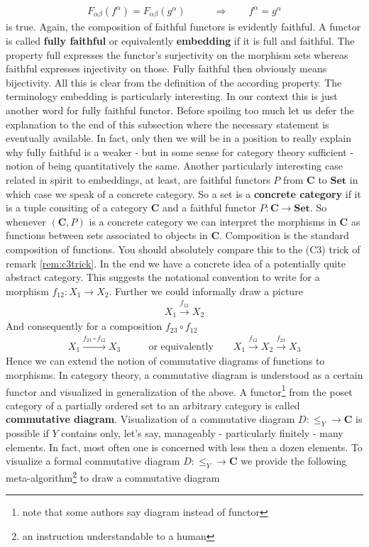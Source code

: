 \begin{align*}
  F_{\alpha\beta}(f^{\alpha})
  =
  F_{\alpha\beta}(g^{\alpha})
  \qquad
  &\Rightarrow
  \qquad
  f^{\alpha}
  =
  g^{\alpha}
\end{align*}
is true. Again, the composition of faithful functors is evidently faithful. A functor is called \textbf{fully faithful} or equivalently \textbf{embedding} if it is full and faithful. The property full expresses the functor's surjectivity on the morphism sets whereas faithful expresses injectivity on those. Fully faithful then obviously means bijectivity. All this is clear from the definition of the according property. The terminology embedding is particularly interesting. In our context this is just another word for fully faithful functor. Before spoiling too much let us defer the explanation to the end of this subsection where the necessary statement is eventually available. In fact, only then we will be in a position to really explain why fully faithful is a weaker - but in some sense for category theory sufficient - notion of being quantitatively the same. Another particularly interesting case related in spirit to embeddings, at least, are faithful functors $P$ from $\mathbf{C}$ to $\mathbf{Set}$ in which case we speak of a concrete category. So a set is a \textbf{concrete category} if it is a tuple consiting of a category $\mathbf{C}$ and a faithful functor $P \colon \mathbf{C} \rightarrow \mathbf{Set}$. So whenever $(\mathbf{C},P)$ is a concrete category we can interpret the morphisms in $\mathbf{C}$ as functions between sets associated to objects in $\mathbf{C}$. Composition is the standard composition of functions. You should absolutely compare this to the (C3) trick of remark \ref{rem:c3trick}. In the end we have a concrete idea of a potentially quite abstract category. This suggests the notational convention to write for a morphism $f_{12} \colon X_{1} \rightarrow X_{2}$. Further we could informally draw a picture
\begin{align*}
  X_{1}
  \xrightarrow{f_{12}}
  X_{2}
\end{align*}
And consequently for a composition $f_{23} \circ f_{12}$
\begin{align*}
  X_{1}
  \xrightarrow{f_{23} \circ f_{12}}
  X_{3}
  \qquad
  &\text{or equivalently}
  \qquad
  X_{1}
  \xrightarrow{f_{12}}
  X_{2}
  \xrightarrow{f_{23}}
  X_{3}
\end{align*}
Hence we can extend the notion of commutative diagrams of functions to morphisms. In category theory, a commutative diagram is understood as a certain functor and visualized in generalization of the above. A functor\footnote{note that some authors say diagram instead of functor} from the poset category of a partially ordered set to an arbitrary category is called \textbf{commutative diagram}. Visualization of a commutative diagram $D \colon \pmb{\leq}_{Y} \rightarrow \mathbf{C}$ is possible if $Y$ contains only, let's say, manageably - particularly finitely - many elements. In fact, most often one is concerned with less then a dozen elements. To visualize a formal commutative diagram $D \colon \pmb{\leq}_{Y} \rightarrow \mathbf{C}$ we provide the following meta-algorithm\footnote{an instruction understandable to a human} to draw a commutative diagram
